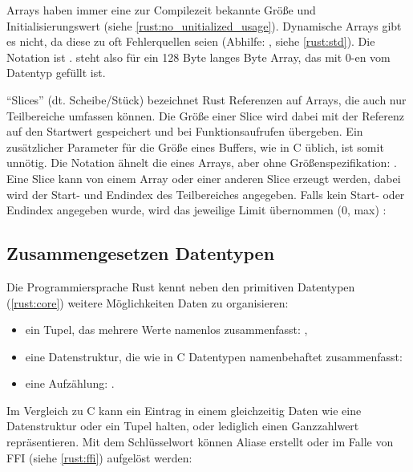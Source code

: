 Arrays haben immer eine zur Compilezeit bekannte Größe und Initialisierungswert (siehe \autoref{rust:no_unitialized_usage}).
Dynamische Arrays gibt es nicht, da diese zu oft Fehlerquellen seien  (Abhilfe: , siehe \autoref{rust:std}).
Die Notation ist .
\rustcinline{[0_u8; 128]} steht also für ein 128 Byte langes Byte Array, das mit 0-en vom Datentyp  gefüllt ist.

\enquote{Slices} (dt. Scheibe/Stück) bezeichnet Rust Referenzen auf Arrays, die auch nur Teilbereiche umfassen können.
Die Größe einer Slice wird dabei mit der Referenz auf den Startwert gespeichert  und bei Funktionsaufrufen übergeben.
Ein zusätzlicher Parameter für die Größe eines Buffers, wie in C üblich, ist somit unnötig.
Die Notation ähnelt die eines Arrays, aber ohne Größenspezifikation: \rustcinline{[<Datentyp>]}.
Eine Slice kann von einem Array oder einer anderen Slice erzeugt werden, dabei wird der Start- und Endindex des Teilbereiches angegeben.
Falls kein Start- oder Endindex angegeben wurde, wird das jeweilige Limit übernommen (0, max) : 

\subsection{Zusammengesetzen Datentypen}

Die Programmiersprache Rust kennt neben den primitiven  Datentypen (\autoref{rust:core}) weitere Möglichkeiten Daten zu organisieren:
\begin{itemize}
	\item ein Tupel, das mehrere Werte namenlos zusammenfasst: ,
	\item eine Datenstruktur, die wie in C Datentypen namenbehaftet zusammenfasst: \linebreak{}
	\item eine Aufzählung: . 
\end{itemize}

Im Vergleich zu C kann ein Eintrag in einem  gleichzeitig Daten wie eine Datenstruktur oder ein Tupel halten, oder lediglich einen Ganzzahlwert repräsentieren.
Mit dem  Schlüsselwort können Aliase erstellt oder im Falle von FFI (siehe \autoref{rust:ffi}) aufgelöst werden: 
 
